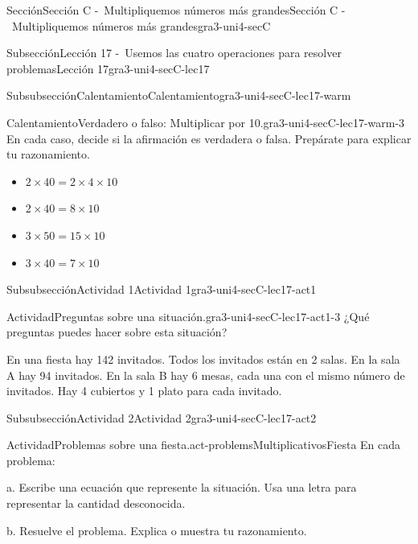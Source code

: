 \documentclass[twoside,10pt,]{article}
\begin{document}
\begin{sectionptx}{Sección}{Sección C -~Multipliquemos números más grandes}{}{Sección C -~Multipliquemos números más grandes}{}{}{gra3-uni4-secC}
\begin{subsectionptx}{Subsección}{Lección 17 -~Usemos las cuatro operaciones para resolver problemas}{}{Lección 17}{}{}{gra3-uni4-secC-lec17}
\begin{subsubsectionptx}{Subsubsección}{Calentamiento}{}{Calentamiento}{}{}{gra3-uni4-secC-lec17-warm}
\begin{exploration}{Calentamiento}{Verdadero o falso: Multiplicar por 10.}{gra3-uni4-secC-lec17-warm-3}
En cada caso, decide si la afirmación es verdadera o falsa. Prepárate para explicar tu razonamiento.%
%
\begin{itemize}[label=\textbullet]
\item{}\(\displaystyle 2 \times 40 = 2 \times 4 \times 10\)%
\item{}\(\displaystyle 2 \times 40 = 8 \times 10\)%
\item{}\(\displaystyle 3 \times 50 = 15 \times 10\)%
\item{}\(\displaystyle 3 \times 40 = 7 \times 10\)%
\end{itemize}
\end{exploration}%
\end{subsubsectionptx}
%
%
\typeout{************************************************}
\typeout{************************************************}
%
\begin{subsubsectionptx}{Subsubsección}{Actividad 1}{}{Actividad 1}{}{}{gra3-uni4-secC-lec17-act1}
\begin{activity}{Actividad}{Preguntas sobre una situación.}{gra3-uni4-secC-lec17-act1-3}%
¿Qué preguntas puedes hacer sobre esta situación?%
\par
En una fiesta hay 142 invitados. Todos los invitados están en 2 salas. En la sala A hay 94 invitados. En la sala B hay 6 mesas, cada una con el mismo número de invitados. Hay 4 cubiertos y 1 plato para cada invitado.%
\end{activity}%
\end{subsubsectionptx}
%
%
\typeout{************************************************}
\typeout{************************************************}
%
\begin{subsubsectionptx}{Subsubsección}{Actividad 2}{}{Actividad 2}{}{}{gra3-uni4-secC-lec17-act2}
\begin{activity}{Actividad}{Problemas sobre una fiesta.}{act-problemsMultiplicativosFiesta}%
En cada problema:%
\begin{sidebyside}{2}{0.05}{0.05}{0}%
\begin{sbspanel}{0.6}%
a. Escribe una ecuación que represente la situación. Usa una letra para representar la cantidad desconocida.%
\par
b. Resuelve el problema. Explica o muestra tu razonamiento.%
\end{sbspanel}%
\begin{sbspanel}{0.3}%

\end{sbspanel}
\end{sidebyside}
\end{activity}
\end{subsubsectionptx}
\end{subsectionptx}
\end{sectionptx}
\end{document}
